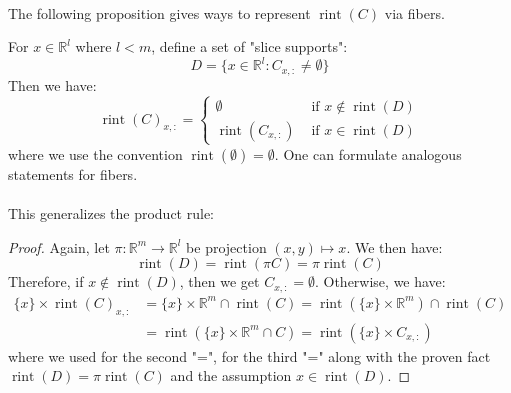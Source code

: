 \paragraph{}The following proposition gives ways to represent $\operatorname{rint}(C)$ via fibers.

\begin{prop}
	\label{prop:012-slice-fiber-rules}
	For $x\in \mathbb{R}^l$ where $l< m$, define a set of "slice supports":
	\[
		D=\{x\in \mathbb{R}^l:C_{x,:}\neq\emptyset\}
	\]
	Then we have:
	\[
		\operatorname{rint}(C)_{x,:}=
		\begin{cases}
			\emptyset                    & \text{ if }x\notin \operatorname{rint}(D) \\
			\operatorname{rint}(C_{x,:}) & \text{ if }x\in \operatorname{rint}(D)
		\end{cases}
	\]
	where we use the convention $\operatorname{rint}(\emptyset)=\emptyset$. One can formulate analogous statements for fibers.
\end{prop}

\paragraph{}This generalizes the product rule:

\begin{proof}
	Again, let $\pi:\mathbb{R}^{m}\to \mathbb{R}^l$ be projection $(x,y)\mapsto x$. We then have:
	\[
		\operatorname{rint}(D)=\operatorname{rint}(\pi C)=\pi \operatorname{rint}(C)
	\]
	Therefore, if $x\notin \operatorname{rint}(D)$, then we get $C_{x,:}=\emptyset$. Otherwise, we have:
	\begin{align*}
		\{x\}\times \operatorname{rint}(C)_{x,:} & = \{x\}\times \mathbb{R}^m\cap \operatorname{rint}(C)                      = \operatorname{rint}(\{x\}\times \mathbb{R}^m)\cap \operatorname{rint}(C) \\
		                                         & = \operatorname{rint}(\{x\}\times \mathbb{R}^m\cap C)                      = \operatorname{rint}(\{x\}\times C_{x,:})
	\end{align*}
	where we used  for the second "=",  for the third "=" along with the proven fact $\operatorname{rint}(D)=\pi \operatorname{rint}(C)$ and the assumption $x\in \operatorname{rint}(D)$.
\end{proof}

